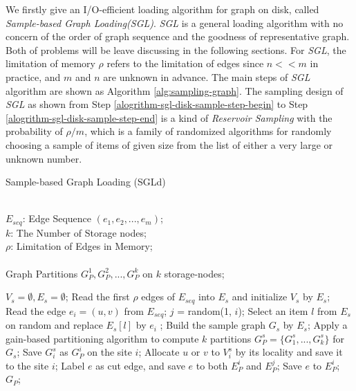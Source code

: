 \documentclass{sig-alternate-2013}
\begin{document}
We firstly give an I/O-efficient loading algorithm for graph on disk, called \textit{Sample-based Graph Loading(SGL)}. \textit{SGL} is a general loading algorithm with no concern of the order of graph sequence and the goodness of representative graph. Both of problems will be leave discussing in the following sections. For \textit{SGL}, the limitation of memory $\rho$ refers to the limitation of edges since $n<<m$ in practice, and $m$ and $n$ are unknown in advance.
The main steps of \textit{SGL} algorithm are shown as Algorithm \ref{alg:sampling-graph}. The sampling design of \textit{SGL} as shown from Step \ref{alogrithm-sgl-disk-sample-step-begin} to Step \ref{alogrithm-sgl-disk-sample-step-end} is a kind of \textit{Reservoir Sampling} \cite{Yves:samplebook} with the probability of $\rho/m$, which is a family of randomized algorithms for randomly choosing a sample of items of given size from the list of either a very large or unknown number.

\begin{algorithm}[h]
\renewcommand{\algorithmicrequire}{\textbf{Input:}}
\renewcommand\algorithmicensure {\textbf{Output:} }
\caption{Sample-based Graph Loading (SGLd)}
\label{alg:sampling-graph}
\begin{algorithmic}[1]
\REQUIRE ~~\\
$E_{seq}$: Edge Sequence $(e_1,e_2,...,e_m)$;\\
$k$: The Number of Storage nodes;\\
$\rho$: Limitation of Edges in Memory;\\
\ENSURE ~~\\
Graph Partitions $G_P^1,G_P^2,...,G_P^k$ on $k$ storage-nodes;

\STATE $V_s=\emptyset,E_s=\emptyset$;
\STATE Read the first $\rho$ edges of $E_{seq}$ into $E_s$ and initialize $V_s$ by $E_s$; \label{alogrithm-sgl-disk-sample-step-begin}
 \STATE Read the edge $e_i=(u,v)$ from $E_{seq}$;
 \STATE $j$ = random(1, $i$);
   \STATE Select an item $l$ from $E_s$ on random and replace $E_s[l]$ by $e_i$ ;
 \ENDIF
\ENDFOR \label{alogrithm-sgl-disk-sample-step-end}
\STATE Build the sample graph  $G_s$ by $E_s$;
\STATE Apply a gain-based partitioning algorithm  to compute $k$ partitions $G_P^s=\{G_1^s,...,G_k^s\}$ for $G_s$;
  \STATE Save $G_i^s$ as $G_P^i$ on the site $i$;
\ENDFOR
{} \label{alogrithm-sgl-disk-allocate-step-begin}
    \STATE Allocate  $u$ or $v$ to $V_i^s$ by its locality and save it to the site $i$;
  \ENDIF %
   \STATE Label $e$ as cut edge, and save $e$ to both $E_P^i$ and $E_P^j$;
  \ELSE
    \STATE Save $e$ to $E_P^i$;
  \ENDIF %
 \ENDFOR \label{alogrithm-sgl-disk-allocate-step-end}
\RETURN $G_P$;
\end{algorithmic}
\end{algorithm}
\end{document}
